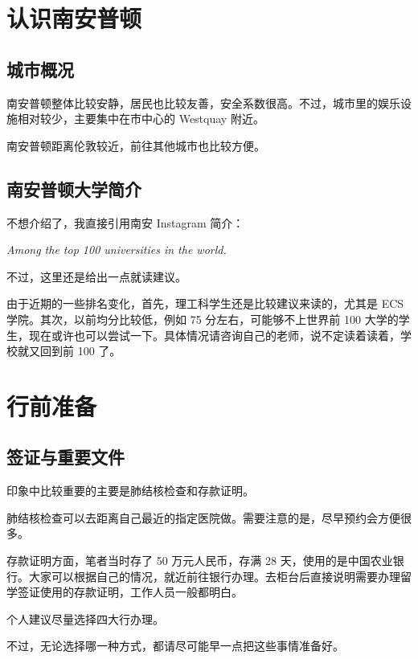 \documentclass[UTF8,12pt,a4paper]{ctexart}
\begin{document}
\section{认识南安普顿}

\subsection{城市概况}

南安普顿整体比较安静，居民也比较友善，安全系数很高。不过，城市里的娱乐设施相对较少，主要集中在市中心的 Westquay 附近。

南安普顿距离伦敦较近，前往其他城市也比较方便。

\subsection{南安普顿大学简介}

不想介绍了，我直接引用南安 Instagram 简介：

\begin{center}
    \textit{Among the top 100 universities in the world.}
\end{center}

不过，这里还是给出一点就读建议。

由于近期的一些排名变化，首先，理工科学生还是比较建议来读的，尤其是 ECS 学院。其次，以前均分比较低，例如 75 分左右，可能够不上世界前 100 大学的学生，现在或许也可以尝试一下。具体情况请咨询自己的老师，说不定读着读着，学校就又回到前 100 了。

\section{行前准备}

\subsection{签证与重要文件}

印象中比较重要的主要是肺结核检查和存款证明。

肺结核检查可以去距离自己最近的指定医院做。需要注意的是，尽早预约会方便很多。

存款证明方面，笔者当时存了 50 万元人民币，存满 28 天，使用的是中国农业银行。大家可以根据自己的情况，就近前往银行办理。去柜台后直接说明需要办理留学签证使用的存款证明，工作人员一般都明白。

个人建议尽量选择四大行办理。

不过，无论选择哪一种方式，都请尽可能早一点把这些事情准备好。
\end{document}
